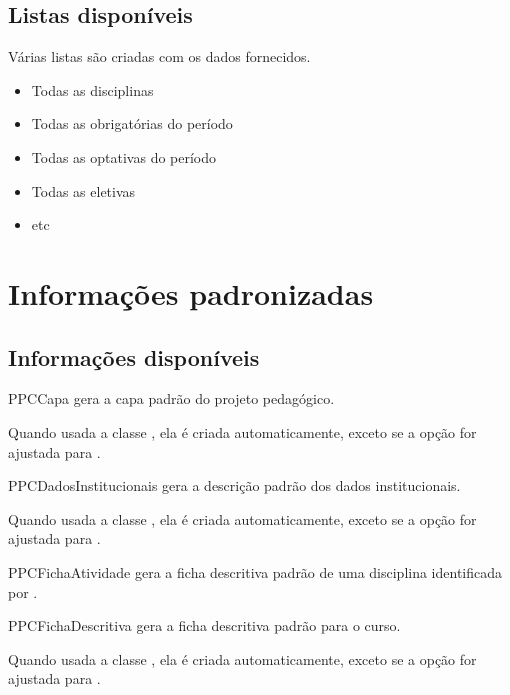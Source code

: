 \documentclass[a4paper, 11pt]{article}
\begin{document}
\subsection{Listas disponíveis}
Várias listas são criadas com os dados fornecidos.

\begin{itemize}
    \item Todas as disciplinas
    \item Todas as obrigatórias do período
    \item Todas as optativas do período
    \item Todas as eletivas
    \item etc
\end{itemize}


\section{Informações padronizadas}

\subsection{Informações disponíveis}

\begin{Macrodef}{PPCCapa}{}{}
     gera a capa padrão do projeto pedagógico.

    Quando usada a classe , ela é criada automaticamente, exceto se a opção  for ajustada para .
\end{Macrodef}

\begin{Macrodef}{PPCDadosInstitucionais}{}{}
     gera a descrição padrão dos dados institucionais.

    Quando usada a classe , ela é criada automaticamente, exceto se a opção  for ajustada para .
\end{Macrodef}

\begin{Macrodef}{PPCFichaAtividade}{}{}
     gera a ficha descritiva padrão de uma disciplina identificada por .
\end{Macrodef}


\begin{Macrodef}{PPCFichaDescritiva}{}{}
     gera a ficha descritiva padrão para o curso.

    Quando usada a classe , ela é criada automaticamente, exceto se a opção  for ajustada para .
\end{Macrodef}
\end{document}
